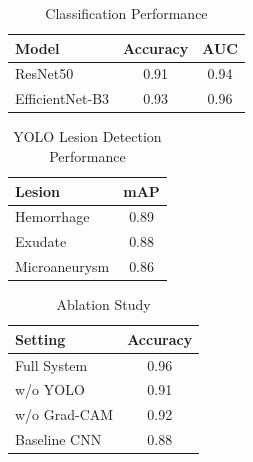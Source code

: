 \begin{table}[ht]
\centering
\caption{Classification Performance}
\begin{tabular}{lcc}
\toprule
Model & Accuracy & AUC \\
\midrule
ResNet50 & 0.91 & 0.94 \\
EfficientNet-B3 & 0.93 & 0.96 \\
\bottomrule
\end{tabular}
\end{table}

\begin{table}[ht]
\centering
\caption{YOLO Lesion Detection Performance}
\begin{tabular}{lc}
\toprule
Lesion & mAP \\
\midrule
Hemorrhage & 0.89 \\
Exudate & 0.88 \\
Microaneurysm & 0.86 \\
\bottomrule
\end{tabular}
\end{table}

\begin{table}[ht]
\centering
\caption{Ablation Study}
\begin{tabular}{lc}
\toprule
Setting & Accuracy \\
\midrule
Full System & 0.96 \\
w/o YOLO & 0.91 \\
w/o Grad-CAM & 0.92 \\
Baseline CNN & 0.88 \\
\bottomrule
\end{tabular}
\end{table}
